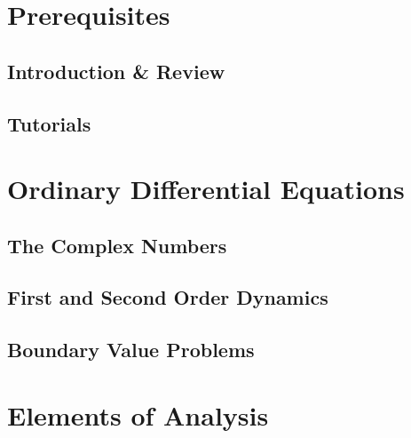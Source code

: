 \documentclass[12pt,letterpaper, openany]{book} %
\begin{document}
 
\frontmatter



%
 
\clearpage
\thispagestyle{empty}
 
\tableofcontents
 
\mainmatter

\part{Prerequisites}
\chapter{Introduction \& Review}


\chapter{Tutorials}


\part{Ordinary Differential Equations}

\chapter{The Complex Numbers}


\chapter{First and Second Order Dynamics}


\chapter{Boundary Value Problems}


\part{Elements of Analysis}
\end{document}
